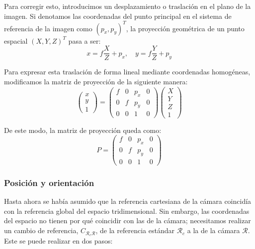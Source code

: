 \documentclass[
10pt, %
a4paper, %
oneside, %
headinclude,footinclude, %
BCOR=5mm, %
]{scrartcl}
\begin{document}
Para corregir esto, introducimos un desplazamiento o traslación en el plano de la imagen. Si denotamos las coordenadas del punto principal en el sistema de referencia de la imagen como $(p_x, p_y)^T$, la proyección geométrica de un punto espacial $(X, Y, Z)^T$ pasa a ser:
\[
    x = f \frac{X}{Z} + p_x, \quad y = f \frac{Y}{Z} + p_y
\]

Para expresar esta traslación de forma lineal mediante coordenadas homogéneas, modificamos la matriz de proyección de la siguiente manera:
\[
    \begin{pmatrix}
        x \\
        y \\
        1
    \end{pmatrix}
    =
    \begin{pmatrix}
        f & 0 & p_x & 0 \\
        0 & f & p_y & 0 \\
        0 & 0 & 1 & 0
    \end{pmatrix}
    \begin{pmatrix}
        X \\
        Y \\
        Z \\
        1
    \end{pmatrix}
\]

De este modo, la matriz de proyección queda como:
\[
    P = \begin{pmatrix} f & 0 & p_x & 0 \\ 0 & f & p_y & 0 \\ 0 & 0 & 1 & 0 \end{pmatrix}
\]

\subsubsection{Posición y orientación}

Hasta ahora se había asumido que la referencia cartesiana de la cámara coincidía con la referencia global del espacio tridimensional. Sin embargo, las coordenadas del espacio no tienen por qué coincidir con las de la cámara; necesitamos realizar un cambio de referencia, $C_{\mathcal{R}_c\mathcal{R}}$, de la referencia estándar $\mathcal{R}_c$ a la de la cámara $\mathcal{R}$. Este se puede realizar en dos pasos:
\end{document}
